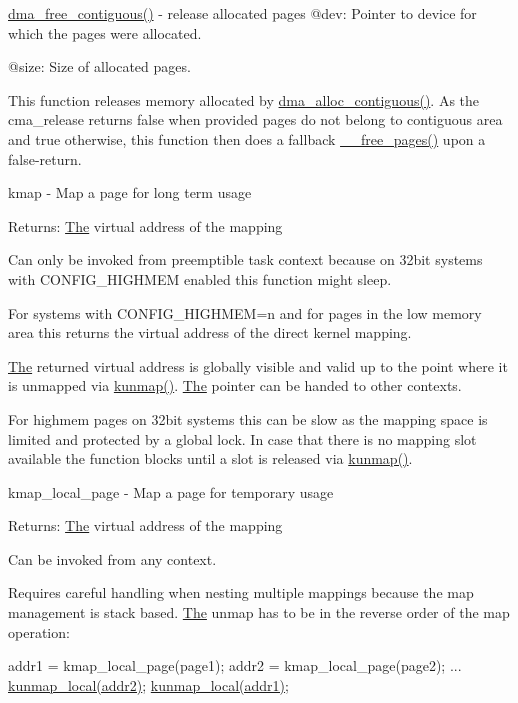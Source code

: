 \mbox{\hyperlink{contiguous_8c_ac95049c6919685e53f70b3edc7b4a20b}{dma\+\_\+free\+\_\+contiguous()}} -\/ release allocated pages @dev\+: Pointer to device for which the pages were allocated.

@size\+: Size of allocated pages.

This function releases memory allocated by \mbox{\hyperlink{contiguous_8c_a92751a27a1a3e17c3dff09bb11a943c3}{dma\+\_\+alloc\+\_\+contiguous()}}. As the cma\+\_\+release returns false when provided pages do not belong to contiguous area and true otherwise, this function then does a fallback \mbox{\hyperlink{page__alloc_8c_a09a84df4c6cb817075a2eece7c7c0345}{\+\_\+\+\_\+free\+\_\+pages()}} upon a false-\/return.

kmap -\/ Map a page for long term usage

Returns\+: \mbox{\hyperlink{classThe}{The}} virtual address of the mapping

Can only be invoked from preemptible task context because on 32bit systems with C\+O\+N\+F\+I\+G\+\_\+\+H\+I\+G\+H\+M\+EM enabled this function might sleep.

For systems with C\+O\+N\+F\+I\+G\+\_\+\+H\+I\+G\+H\+M\+EM=n and for pages in the low memory area this returns the virtual address of the direct kernel mapping.

\mbox{\hyperlink{classThe}{The}} returned virtual address is globally visible and valid up to the point where it is unmapped via \mbox{\hyperlink{include_2linux_2highmem_8h_a8c784a6f8e3f1de05d625a30d0fdfda1}{kunmap()}}. \mbox{\hyperlink{classThe}{The}} pointer can be handed to other contexts.

For highmem pages on 32bit systems this can be slow as the mapping space is limited and protected by a global lock. In case that there is no mapping slot available the function blocks until a slot is released via \mbox{\hyperlink{include_2linux_2highmem_8h_a8c784a6f8e3f1de05d625a30d0fdfda1}{kunmap()}}.

kmap\+\_\+local\+\_\+page -\/ Map a page for temporary usage

Returns\+: \mbox{\hyperlink{classThe}{The}} virtual address of the mapping

Can be invoked from any context.

Requires careful handling when nesting multiple mappings because the map management is stack based. \mbox{\hyperlink{classThe}{The}} unmap has to be in the reverse order of the map operation\+:

addr1 = kmap\+\_\+local\+\_\+page(page1); addr2 = kmap\+\_\+local\+\_\+page(page2); ... \mbox{\hyperlink{highmem-internal_8h_a769f5d38123c52221df2134f5f5bdc25}{kunmap\+\_\+local(addr2)}}; \mbox{\hyperlink{highmem-internal_8h_a769f5d38123c52221df2134f5f5bdc25}{kunmap\+\_\+local(addr1)}};

